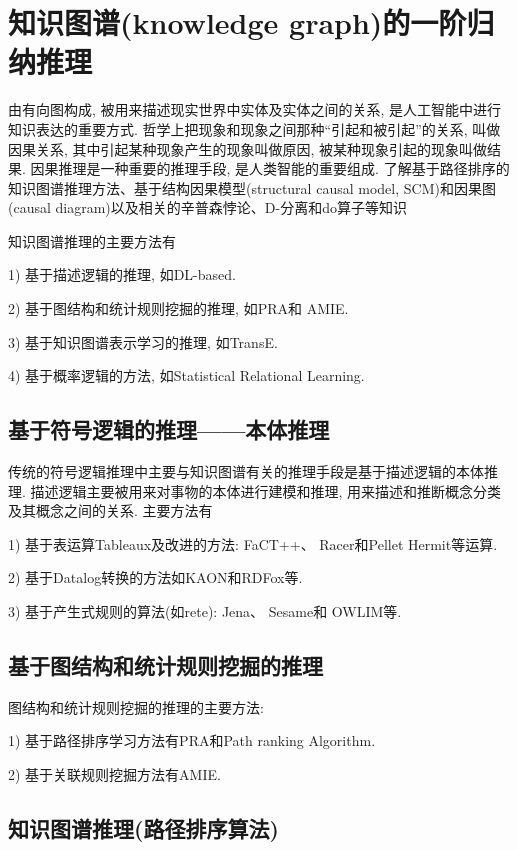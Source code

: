 \section{知识图谱(knowledge graph)的一阶归纳推理}
    由有向图构成, 被用来描述现实世界中实体及实体之间的关系, 是人工智能中进行知识表达的重要方式. 哲学上把现象和现象之间那种“引起和被引起”的关系, 叫做因果关系, 其中引起某种现象产生的现象叫做原因, 被某种现象引起的现象叫做结果.
因果推理是一种重要的推理手段, 是人类智能的重要组成. 了解基于路径排序的知识图谱推理方法、基于结构因果模型(structural causal model, SCM)和因果图(causal diagram)以及相关的辛普森悖论、D-分离和do算子等知识

知识图谱推理的主要方法有

1) 基于描述逻辑的推理, 如DL-based.

2) 基于图结构和统计规则挖掘的推理, 如PRA和 AMIE.

3) 基于知识图谱表示学习的推理, 如TransE.

4) 基于概率逻辑的方法, 如Statistical Relational Learning.
\subsection{基于符号逻辑的推理——本体推理}
    传统的符号逻辑推理中主要与知识图谱有关的推理手段是基于描述逻辑的本体推理.
描述逻辑主要被⽤来对事物的本体进⾏建模和推理, ⽤来描述和推断概念分类及其概念之间的关系. 主要方法有

1) 基于表运算Tableaux及改进的方法: FaCT++、 Racer和Pellet Hermit等运算.

2) 基于Datalog转换的方法如KAON和RDFox等.

3) 基于产生式规则的算法(如rete): Jena、 Sesame和 OWLIM等.

\subsection{基于图结构和统计规则挖掘的推理}

图结构和统计规则挖掘的推理的主要方法:

1) 基于路径排序学习方法有PRA和Path ranking Algorithm.

2) 基于关联规则挖掘方法有AMIE.
\subsection{知识图谱推理(路径排序算法)}

